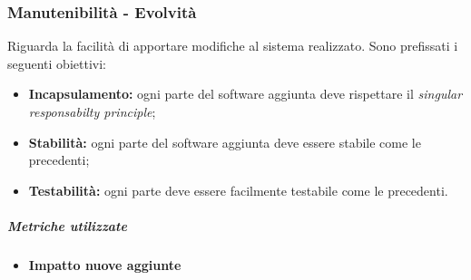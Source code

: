 \subsubsection{Manutenibilità - Evolvità}
Riguarda la facilità di apportare modifiche al sistema realizzato. Sono prefissati i seguenti obiettivi:
\begin{itemize}
	\item \textbf{Incapsulamento:} ogni parte del software aggiunta deve rispettare il \textit{singular responsabilty principle};
	\item \textbf{Stabilità:} ogni parte del software aggiunta deve essere stabile come le precedenti;
	\item \textbf{Testabilità:} ogni parte deve essere facilmente testabile come le precedenti.
\end{itemize}
\vspace{0.8cm}
\subparagraph{Metriche utilizzate}
\begin{itemize}
	\item \textbf{Impatto nuove aggiunte}
\end{itemize}
\begin{table}[!htpb]
	\centering
	\renewcommand{\arraystretch}{2} 
	\caption{TBD}
\end{table}
